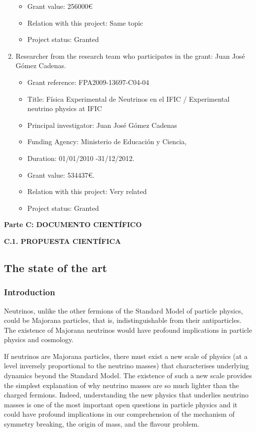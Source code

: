 \documentclass[a4paper,11pt,oneside]{article}
\begin{document}
\begin{enumerate}
\begin{itemize}
  \item[] Grant value: 256000\euro
  \item[] Relation with this project: Same topic
  \item[] Project status: Granted
  \end{itemize}
\item Researcher from the research team who participates in the grant: Juan Jos\'e G\'omez Cadenas.
  \begin{itemize}
  \item[] Grant reference: FPA2009-13697-C04-04 
  \item[] Title:  Física Experimental de Neutrinos en el IFIC / Experimental neutrino physics at IFIC 
  \item[] Principal investigator: Juan Jos\'e G\'omez Cadenas
  \item[] Funding Agency:  Ministerio de Educaci\'on y Ciencia, 
  \item[] Duration: 01/01/2010 -31/12/2012.
  \item[] Grant value: 534437\euro. 
  \item[] Relation with this project: Very related
  \item[] Project status: Granted
  \end{itemize}
\end{enumerate}

\newpage
\setcounter{page}{1}

\begin{tcolorbox}[colback=yellow,arc=0pt,outer arc=0pt,colframe=black,boxrule=0.6pt,left=0mm]
  \textbf{Parte C: DOCUMENTO CIENT\'IFICO}
\end{tcolorbox}

\noindent\textbf{C.1. PROPUESTA CIENT\'IFICA}
\subsection*{The state of the art}
\subsubsection*{Introduction}
Neutrinos, unlike the other fermions of the Standard Model of particle physics, could be Majorana particles, that is, indistinguishable from their antiparticles. The existence of Majorana neutrinos would have profound implications in particle physics and cosmology. 

If neutrinos are Majorana particles, there must exist a new scale of physics (at a level inversely proportional to the neutrino masses) that characterises underlying dynamics beyond the Standard Model. The existence of such a new scale provides the simplest explanation of why neutrino masses are so much lighter than the charged fermions. Indeed,  understanding the new physics that underlies neutrino masses is one of the most important open questions in particle physics and it could have profound implications in our comprehension of the mechanism of symmetry breaking, the origin of mass, and the flavour problem. 
\end{document}
